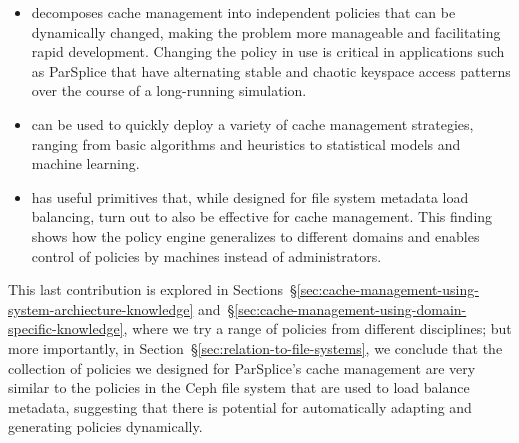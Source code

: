 \begin{itemize}

  \item decomposes cache management into independent policies that can be
  dynamically changed, making the problem more manageable and facilitating rapid
  development. Changing the policy in use is critical in applications such as
  ParSplice that have alternating stable and chaotic keyspace access patterns
  over the course of a long-running simulation.  

  \item can be used to quickly deploy a variety of cache management strategies,
  ranging from basic algorithms and heuristics to statistical models and machine
  learning.

  \item has useful primitives that, while designed for file system metadata
  load balancing, turn out to also be effective for cache management. This
  finding shows how the policy engine generalizes to different domains and
  enables control of policies by machines instead of administrators.

\end{itemize}


This last contribution is explored in
Sections~\S\ref{sec:cache-management-using-system-archiecture-knowledge}
and~\S\ref{sec:cache-management-using-domain-specific-knowledge}, where we try
a range of policies from different disciplines; but more importantly, in
Section~\S\ref{sec:relation-to-file-systems}, we conclude that the collection
of policies we designed for ParSplice's cache management are very similar to
the policies in the Ceph file system that are used to load balance metadata,
suggesting that there is potential for automatically adapting and generating
policies dynamically. 


